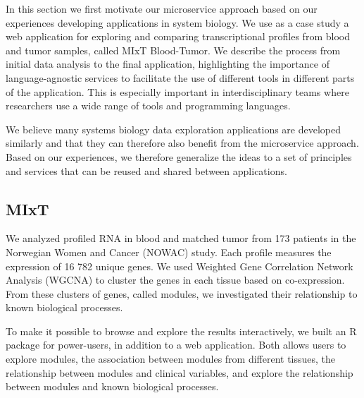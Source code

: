 In this section we first motivate our microservice approach based on our
experiences developing applications in system biology.
We use as a case study a web application for exploring and comparing
transcriptional profiles from blood and tumor samples, called MIxT Blood-Tumor. 
We describe the process from initial data analysis to the final application,
highlighting the importance
of language-agnostic services to facilitate the use of different tools in
different parts of the application. This is especially important in
interdisciplinary teams where researchers use a wide range of tools and
programming languages.  

We believe many systems biology data exploration applications are developed
similarly and that they can therefore also benefit from the microservice
approach. 
Based on our experiences, we therefore generalize the ideas to a set of principles and
services that can be reused and shared between applications. 




\subsection*{MIxT} 
We analyzed profiled RNA in blood and matched tumor from 173 patients in the
Norwegian Women and Cancer (NOWAC) study. Each profile measures the expression
of 16 782 unique genes. We used Weighted Gene Correlation Network Analysis
(WGCNA)\cite{langfelder2008wgcna} to cluster the genes in each tissue
based on co-expression. From these clusters of genes, called modules, we
investigated their relationship to known biological processes. 

To make it possible to browse and explore the results interactively, we built an
R package for power-users, in addition to a web application. Both allows users
to explore modules, the association between modules from different tissues, the
relationship between modules and clinical variables, and explore the
relationship between modules and known biological processes. 

